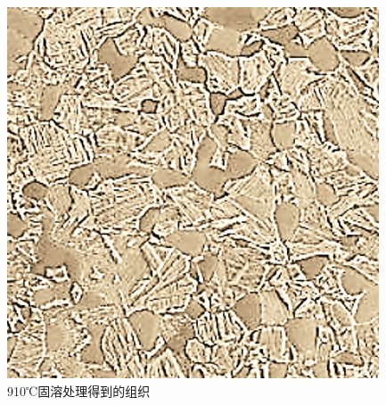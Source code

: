 \begin{figure}[htbp]
{		\begin{minipage}[t]{0.33\linewidth}
			\centering
			\includegraphics[width=0.8\linewidth]{pic/组织分析/910+590}
		\end{minipage}
	}%
	\centering
	\caption{910℃固溶处理得到的组织}
	\label{fig:910c}
\end{figure}



